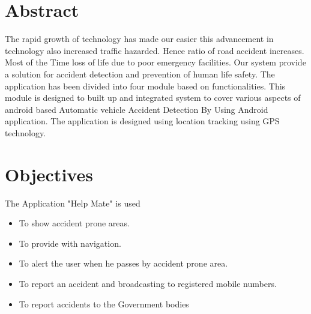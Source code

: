 \documentclass{article}
\begin{document}
\thispagestyle{empty}
\newpage
\tableofcontents{}
\thispagestyle{empty}
\newpage
{}
\begin{center}
\section*{Abstract}
\begin{flushleft}
\justifying
The rapid growth of technology has made our easier this advancement in technology also increased traffic hazarded. Hence ratio of road accident increases. Most of the Time loss of life due to poor emergency facilities. Our system provide a solution for accident  detection and prevention of human life safety. The application has  been divided into four module based on functionalities. This module is designed to built up and integrated system to cover various aspects of android based Automatic vehicle Accident Detection By Using Android application. The application is designed using location tracking using GPS technology. 
\end{flushleft}
    
\section*{Objectives}
\begin{flushleft}
    The Application "Help Mate" is used  
         \begin{itemize}
        \item To show accident prone areas.
        \item To provide with navigation.
        \item To alert the user when he passes by accident prone area.
        \item To report an accident and broadcasting to registered mobile numbers.
        \item To report accidents to the Government bodies
        \end{itemize}
\end{flushleft}

\end{center}
\newpage

\listoffigures
\end{document}
